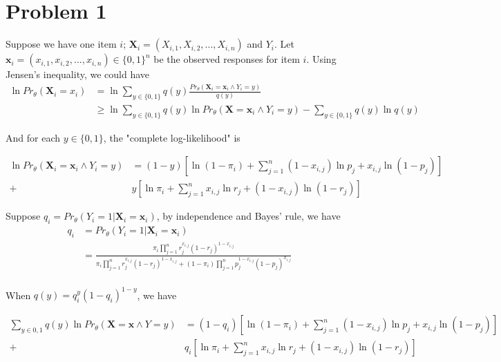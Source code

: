 \documentclass[twoside,11pt]{homework}
\begin{document}
\maketitle

\section*{Problem 1}
\indent
Suppose we have one item $i$; $\pmb X_i = (X_{i,1}, X_{i,2}, ... , X_{i,n})$ and $Y_i$. Let $\pmb x_i = (x_{i, 1}, x_{i,2}, ..., x_{i, n}) \in \{0, 1\} ^ n$ be the observed responses for item $i$. Using Jensen's inequality, we could have
\begin{align*}
\ln Pr_\theta(\pmb X_i = x_i) & = \ln \sum_{y\in \{0, 1\}} q(y)  \frac{Pr_\theta(\pmb X_i =  \pmb x_i \wedge Y_i = y )}{q(y)} \\
& \geq \ln \sum_{y\in \{0, 1\}} q(y) \ln Pr_{\theta} (\pmb X = \pmb x_i \wedge Y_i = y) - \sum_{y\in \{0, 1\}} q(y) \ln q(y)
\end{align*}

And for each $y \in \{ 0, 1\}$, the "complete log-likelihood" is 

\begin{align*}
\ln Pr_\theta(\pmb X_i =  \pmb x_i \wedge Y_i = y )
&= (1-y) [\ln (1 - \pi_i) + \sum_{j =1}^{n} (1 - x_{i, j})\ln p_j + x_{i,j} \ln (1 - p_j)] \\
+ &y [\ln \pi_i + \sum_{j =1}^{n}x_{i, j}\ln r_j + (1-x_{i,j}) \ln (1 - r_j)] 
\end{align*}

Suppose $q_i = Pr_\theta(Y_i = 1 | \pmb X_i = \pmb x_i )$, by independence and Bayes' rule, we have
\begin{align*} 
q_i & = Pr_\theta(Y_i = 1 | \pmb X_i = \pmb x_i ) \\ 
& = \frac {\pi _i  \prod _ {j =1} ^ n  r _ j ^ {x_{i, j}}  (1-r_j)^{1- x_{i,j}}}  {\pi _i  \prod _ {j =1} ^ n  r _ j ^ {x_{i, j}}  (1-r_j)^{1- x_{i,j}} + (1 - \pi _i)  \prod _ {j =1} ^ n  p _ j ^ {1 - x_{i, j}}  (1-p_j)^{x_{i,j}}}\\
\end{align*}

When $q(y) = q_i ^ y (1 - q_i) ^ {1 - y}$, we have 

\begin{align*}
\sum _ { y \in {0 , 1}}  q (y) \ln Pr_\theta(\pmb X = \pmb x \wedge  Y =  y )
&= (1-q_i) [\ln (1 - \pi_i) + \sum_{j =1}^{n} (1 - x_{i, j})\ln p_j + x_{i,j} \ln (1 - p_j)] \\
+ & q_i [\ln \pi_i + \sum_{j =1}^{n}x_{i, j}\ln r_j + (1-x_{i,j}) \ln (1 - r_j)] 
\end{align*}
\end{document}
